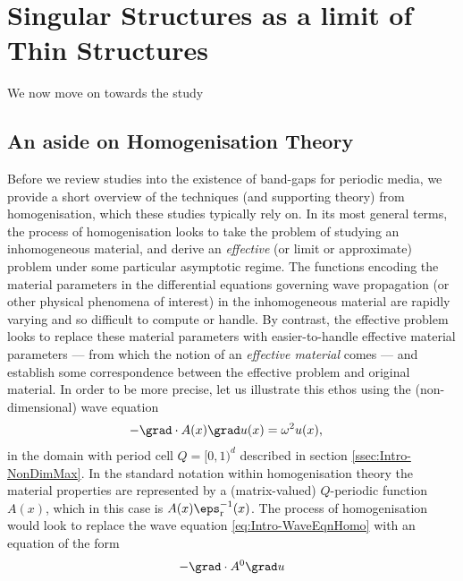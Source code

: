 \section{Singular Structures as a limit of Thin Structures} \label{sec:ConvToSS}

We now move on towards the study

\subsection{An aside on Homogenisation Theory} \label{ssec:Intro-HomoTheory}

Before we review studies into the existence of band-gaps for periodic media, we provide a short overview of the techniques (and supporting theory) from homogenisation, which these studies typically rely on.
In its most general terms, the process of homogenisation looks to take the problem of studying an inhomogeneous material, and derive an \emph{effective} (or limit or approximate) problem under some particular asymptotic regime.
The functions encoding the material parameters in the differential equations governing wave propagation (or other physical phenomena of interest) in the inhomogeneous material are rapidly varying and so difficult to compute or handle.
By contrast, the effective problem looks to replace these material parameters with easier-to-handle effective material parameters --- from which the notion of an \emph{effective material} comes --- and establish some correspondence between the effective problem and original material.
In order to be more precise, let us illustrate this ethos using the (non-dimensional) wave equation 
\begin{align} \label{eq:Intro-WaveEqnHomo}
	-\grad\cdot A(x)\grad u(x) &= \omega^2 u(x),
\end{align}
in the domain with period cell $Q=[0,1)^d$ described in section \ref{ssec:Intro-NonDimMax}.
In the standard notation within homogenisation theory the material properties are represented by a (matrix-valued) $Q$-periodic function $A(x)$, which in this case is $A(x)\eps_{\mathrm{r}}^{-1}(x)$.
The process of homogenisation would look to replace the wave equation \eqref{eq:Intro-WaveEqnHomo} with an equation of the form
\begin{align}
	-\grad\cdot A^{0}\grad u
\end{align}

